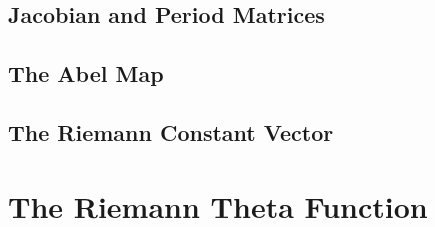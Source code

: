 \subsection{Jacobian and Period
  Matrices}\label{subsec:background-jacobian-and-period-matrices}

\subsection{The Abel Map}\label{subsec:background-the-abel-map}

\subsection{The Riemann Constant
  Vector}\label{subsec:background-the-riemann-constant-vector}

\section{The Riemann Theta
  Function}\label{sec:background-riemann-theta-function}

